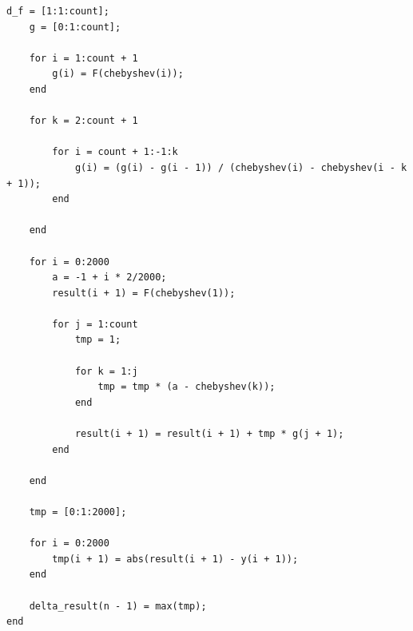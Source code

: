 \documentclass[12pt,a4paper,UTF8]{ctexart}
\theoremstyle{nonumberplain}
\begin{document}
\begin{enumerate}
\begin{enumerate}
\begin{lstlisting}[frame=single]
    d_f = [1:1:count];
    g = [0:1:count];

    for i = 1:count + 1
        g(i) = F(chebyshev(i));
    end

    for k = 2:count + 1

        for i = count + 1:-1:k
            g(i) = (g(i) - g(i - 1)) / (chebyshev(i) - chebyshev(i - k + 1));
        end

    end

    for i = 0:2000
        a = -1 + i * 2/2000;
        result(i + 1) = F(chebyshev(1));

        for j = 1:count
            tmp = 1;

            for k = 1:j
                tmp = tmp * (a - chebyshev(k));
            end

            result(i + 1) = result(i + 1) + tmp * g(j + 1);
        end

    end

    tmp = [0:1:2000];

    for i = 0:2000
        tmp(i + 1) = abs(result(i + 1) - y(i + 1));
    end

    delta_result(n - 1) = max(tmp);
end


\end{lstlisting}
\end{enumerate}
\end{enumerate}
\end{document}
